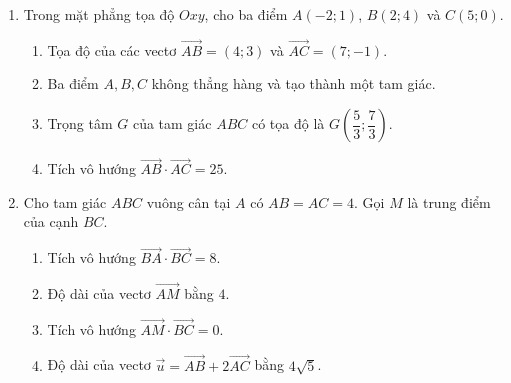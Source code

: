 \documentclass[10pt,a4paper]{article}
\begin{document}
\begin{enumerate}
\item Trong mặt phẳng tọa độ $Oxy$, cho ba điểm $A(-2; 1)$, $B(2; 4)$ và $C(5; 0)$.
\begin{enumerate}
    \item Tọa độ của các vectơ $\vec{AB} = (4; 3)$ và $\vec{AC} = (7; -1)$.
    \item Ba điểm $A, B, C$ không thẳng hàng và tạo thành một tam giác.
    \item Trọng tâm $G$ của tam giác $ABC$ có tọa độ là $G\left(\dfrac{5}{3}; \dfrac{7}{3}\right)$.
    \item Tích vô hướng $\vec{AB} \cdot \vec{AC} = 25$.
\end{enumerate}

\item Cho tam giác $ABC$ vuông cân tại $A$ có $AB = AC = 4$. Gọi $M$ là trung điểm của cạnh $BC$.
\begin{enumerate}
    \item Tích vô hướng $\vec{BA} \cdot \vec{BC} = 8$.
    \item Độ dài của vectơ $\vec{AM}$ bằng $4$.
    \item Tích vô hướng $\vec{AM} \cdot \vec{BC} = 0$.
    \item Độ dài của vectơ $\vec{u} = \vec{AB} + 2\vec{AC}$ bằng $4\sqrt{5}$.
\end{enumerate}
\end{enumerate}
\end{document}

